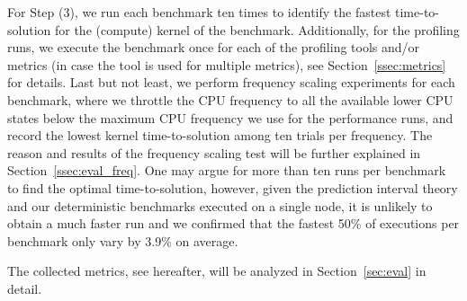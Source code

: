 %
For Step (3), we run each benchmark ten times to identify the fastest time-to-solution for the
(compute) kernel of the benchmark. Additionally, for the profiling runs, we execute the benchmark
once for each of the profiling tools and/or metrics (in case the tool is used for multiple metrics),
see Section~\ref{ssec:metrics} for details. Last but not least, we perform frequency scaling experiments
for each benchmark, where we throttle the CPU frequency to all the available lower CPU states
below the maximum CPU frequency we use for the performance runs, and record the lowest kernel
time-to-solution among ten trials per frequency. The reason and results of the frequency scaling
test will be further explained in Section~\ref{ssec:eval_freq}.
One may argue for more than ten runs per benchmark to find the optimal time-to-solution, however,
given the prediction interval theory and our deterministic benchmarks executed on a single node,
it is unlikely to obtain a much faster run and we confirmed that the fastest 50\% of executions per
benchmark only vary by 3.9\% on average.

The collected metrics, see hereafter, will be analyzed in Section~\ref{sec:eval} in detail.

